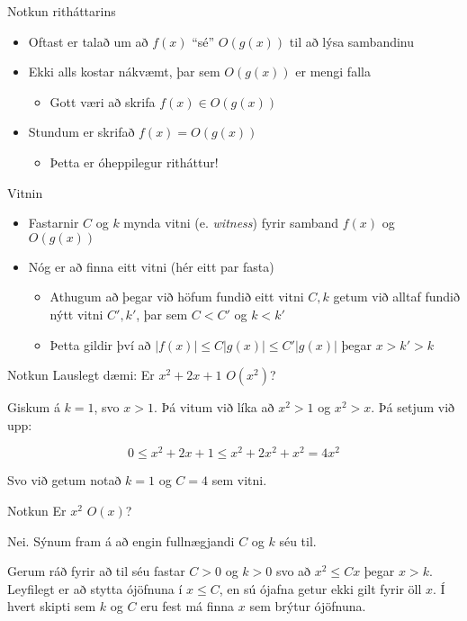 \documentclass{beamer}
\begin{document}
\begin{frame}{Notkun ritháttarins}
\begin{itemize}
 \item Oftast er talað um að $f(x)$ ``sé'' $O(g(x))$ til að lýsa sambandinu
 \item Ekki alls kostar nákvæmt, þar sem $O(g(x))$ er mengi falla
 \begin{itemize}
  \item Gott væri að skrifa $f(x) \in O(g(x))$
 \end{itemize}
 \item Stundum er skrifað $f(x) = O(g(x))$
 \begin{itemize}
  \item Þetta er óheppilegur ritháttur!
 \end{itemize}
\end{itemize}
\end{frame}

\begin{frame}{Vitnin}
\begin{itemize}
 \item Fastarnir $C$ og $k$ mynda vitni (e. \emph{witness}) fyrir samband $f(x)$ og $O(g(x))$
 \item Nóg er að finna eitt vitni (hér eitt par fasta)
 \begin{itemize}
  \item Athugum að þegar við höfum fundið eitt vitni $C, k$ getum við alltaf fundið nýtt vitni $C', k'$, þar sem $C < C'$ og $k < k'$
  \item Þetta gildir því að $|f(x)| \leq C|g(x)| \leq C'|g(x)|$ þegar $x > k' > k$
 \end{itemize}
\end{itemize}
\end{frame}

\begin{frame}{Notkun}
Lauslegt dæmi: Er $x^2 + 2x + 1$ $O(x^2)$? \pause

Giskum á $k = 1$, svo $x > 1$. Þá vitum við líka að $x^2 > 1$ og $x^2 > x$. Þá setjum við upp:

\[
 0 \leq x^2 + 2x + 1 \leq x^2 + 2x^2 + x^2 = 4x^2
\]

Svo við getum notað $k = 1$ og $C = 4$ sem vitni.
\end{frame}

\begin{frame}{Notkun}
Er $x^2$ $O(x)$?\pause

Nei. Sýnum fram á að engin fullnægjandi $C$ og $k$ séu til.

Gerum ráð fyrir að til séu fastar $C > 0$ og $k > 0$ svo að $x^2 \leq C x$ þegar $x > k$. Leyfilegt er að stytta ójöfnuna í $x \leq C$, en sú ójafna getur ekki gilt fyrir öll $x$. Í hvert skipti sem $k$ og $C$ eru fest má finna $x$ sem brýtur ójöfnuna.
\end{frame}
\end{document}
